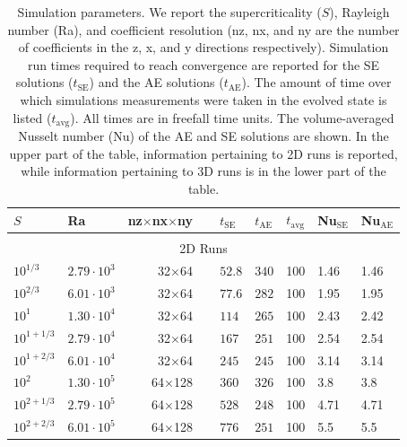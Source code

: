 \documentclass[aps, pre, onecolumn, nofootinbib, notitlepage, groupedaddress, amsfonts, amssymb, amsmath, longbibliography]{revtex4-1}
\begin{document}
\begin{table}
\caption{Simulation parameters. We report the supercriticality ($S$), Rayleigh number (Ra), 
and coefficient resolution (nz, nx, and ny are the number of coefficients in the
z, x, and y directions respectively).
Simulation run times required to reach convergence
are reported for the SE solutions ($t_{\text{SE}}$) and the AE solutions ($t_{\text{AE}}$).
The amount of time over which simulations measurements were taken in the evolved
state is listed ($t_{\text{avg}}$). All times are in freefall time units.  
The volume-averaged Nusselt number (Nu) of the
AE and SE solutions are shown.
In the upper part of the table, information pertaining to 2D runs is reported,
while information pertaining to 3D runs is in the lower part of the table.
}
\label{table:run_parameters}
\begin{center}
\begin{tabularx}{\textwidth}{ X X r | X X X | X X }
\hline																	
$S$	&	Ra	&	nz$\times$nx$\times$ny$\,\,\,\,\,\,\,$	&	$t_{\text{SE}}$	&	$t_{\text{AE}}$	&	$t_{\text{avg}}$	&	Nu$_{\text{SE}}$	&	Nu$_{\text{AE}}$	\\
\hline \hline \multicolumn{8}{c}{\vspace{-0.2cm}}\\
\multicolumn{8}{c}{\vspace{0.1cm}2D Runs} \\
\hline
$10^{1/3}$	    &	$2.79 \cdot 10^3$       &	32$\times$64$\,\,\,\,\,\,\,$&	$52.8$	&	$340$	&	100	&	1.46	&	1.46	\\
$10^{2/3}$	    &	$6.01 \cdot 10^3$       &	32$\times$64$\,\,\,\,\,\,\,$&	$77.6$	&	$282$	&	100	&	1.95	&	1.95	\\
$10^1$	        &	$1.30 \cdot 10^4$       &  	32$\times$64$\,\,\,\,\,\,\,$&	$114$	&	$265$	&	100	&	2.43	&	2.42	\\
$10^{1 + 1/3}$	&	$2.79 \cdot 10^4$       &	32$\times$64$\,\,\,\,\,\,\,$&	$167$	&	$251$	&	100	&	2.54	&	2.54	\\
$10^{1 + 2/3}$	&	$6.01 \cdot 10^4$       &	32$\times$64$\,\,\,\,\,\,\,$&	$245$	&	$245$	&	100	&	3.14	&	3.14	\\
$10^2$	        &	$1.30 \cdot 10^5$       &	64$\times$128$\,\,\,\,\,\,\,$&	$360$	&	$326$	&	100	&	3.8	&	3.8	\\
$10^{2 + 1/3}$	&	$2.79 \cdot 10^5$       &	64$\times$128$\,\,\,\,\,\,\,$&	$528$	&	$248$	&	100	&	4.71	&	4.71	\\
$10^{2 + 2/3}$	&	$6.01 \cdot 10^5$       &	64$\times$128$\,\,\,\,\,\,\,$&	$776$	&	$251$	&	100	&	5.5	&	5.5	\\

\end{tabularx}
\end{center}
\end{table}
\end{document}
